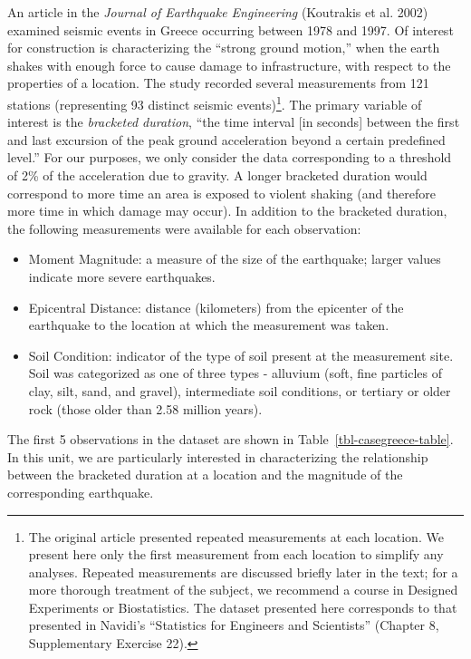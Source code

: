 \documentclass[
  letterpaper,
  DIV=11,
  numbers=noendperiod]{scrreprt}
\providecommand{\tightlist}{%
  \setlength{\itemsep}{0pt}\setlength{\parskip}{0pt}}\usepackage{longtable,booktabs,array}
\theoremstyle{definition}
\theoremstyle{definition}
\theoremstyle{plain}
\theoremstyle{remark}
\begin{document}
An article in the \emph{Journal of Earthquake Engineering} (Koutrakis et
al. 2002) examined seismic events in Greece occurring between 1978 and
1997. Of interest for construction is characterizing the ``strong ground
motion,'' when the earth shakes with enough force to cause damage to
infrastructure, with respect to the properties of a location. The study
recorded several measurements from 121 stations (representing 93
distinct seismic events)\footnote{The original article presented
  repeated measurements at each location. We present here only the first
  measurement from each location to simplify any analyses. Repeated
  measurements are discussed briefly later in the text; for a more
  thorough treatment of the subject, we recommend a course in Designed
  Experiments or Biostatistics. The dataset presented here corresponds
  to that presented in Navidi's ``Statistics for Engineers and
  Scientists'' (Chapter 8, Supplementary Exercise 22).}. The primary
variable of interest is the \emph{bracketed duration}, ``the time
interval {[}in seconds{]} between the first and last excursion of the
peak ground acceleration beyond a certain predefined level.'' For our
purposes, we only consider the data corresponding to a threshold of 2\%
of the acceleration due to gravity. A longer bracketed duration would
correspond to more time an area is exposed to violent shaking (and
therefore more time in which damage may occur). In addition to the
bracketed duration, the following measurements were available for each
observation:

\begin{itemize}
\tightlist
\item
  Moment Magnitude: a measure of the size of the earthquake; larger
  values indicate more severe earthquakes.
\item
  Epicentral Distance: distance (kilometers) from the epicenter of the
  earthquake to the location at which the measurement was taken.
\item
  Soil Condition: indicator of the type of soil present at the
  measurement site. Soil was categorized as one of three types -
  alluvium (soft, fine particles of clay, silt, sand, and gravel),
  intermediate soil conditions, or tertiary or older rock (those older
  than 2.58 million years).
\end{itemize}

The first 5 observations in the dataset are shown in
Table~\ref{tbl-casegreece-table}. In this unit, we are particularly
interested in characterizing the relationship between the bracketed
duration at a location and the magnitude of the corresponding
earthquake.
\end{document}
